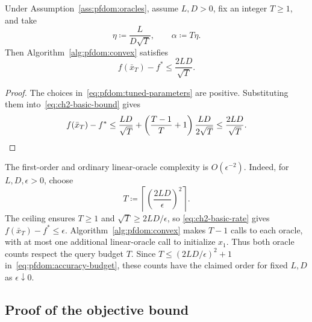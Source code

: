 \begin{Thm:Corollary}\label{cor:ch2-specialization}
Under Assumption~\ref{ass:pfdom:oracles}, assume $L,D>0$, fix an integer
$T\geq1$, and take
\begin{equation}\label{eq:pfdom:tuned-parameters}
    \eta\coloneqq\frac{L}{D\sqrt T},\qquad
    \alpha\coloneqq T\eta.
\end{equation}
Then Algorithm~\ref{alg:pfdom:convex} satisfies
\begin{equation}\label{eq:ch2-basic-rate}
    f(\bar x_T)-f^*
    \leq\frac{2LD}{\sqrt T}.
\end{equation}
\end{Thm:Corollary}
\begin{proof}
The choices in~\eqref{eq:pfdom:tuned-parameters} are positive. Substituting
them into~\eqref{eq:ch2-basic-bound} gives
\[
 f(\bar x_T)-f^*
 \le\frac{LD}{\sqrt T}
       +\left(\frac{T-1}{T}+1\right)
        \frac{LD}{2\sqrt T}
 \le\frac{2LD}{\sqrt T}.
 \qedhere
\]
\end{proof}

The first-order and ordinary linear-oracle complexity is $O(\epsilon^{-2})$.
Indeed, for $L,D,\epsilon>0$, choose
\begin{equation}\label{eq:pfdom:accuracy-budget}
 T\coloneqq\left\lceil\left(\frac{2LD}{\epsilon}\right)^2\right\rceil.
\end{equation}
The ceiling ensures $T\geq1$ and $\sqrt T\geq2LD/\epsilon$, so
\eqref{eq:ch2-basic-rate} gives $f(\bar x_T)-f^*\leq\epsilon$.
Algorithm~\ref{alg:pfdom:convex} makes $T-1$ calls to each oracle,
with at most one additional linear-oracle call to initialize $x_1$.
Thus both oracle counts respect the query budget $T$.
Since $T\leq(2LD/\epsilon)^2+1$ in~\eqref{eq:pfdom:accuracy-budget},
these counts have the claimed order for fixed $L,D$ as $\epsilon\downarrow0$.

\subsection{Proof of the objective bound}

